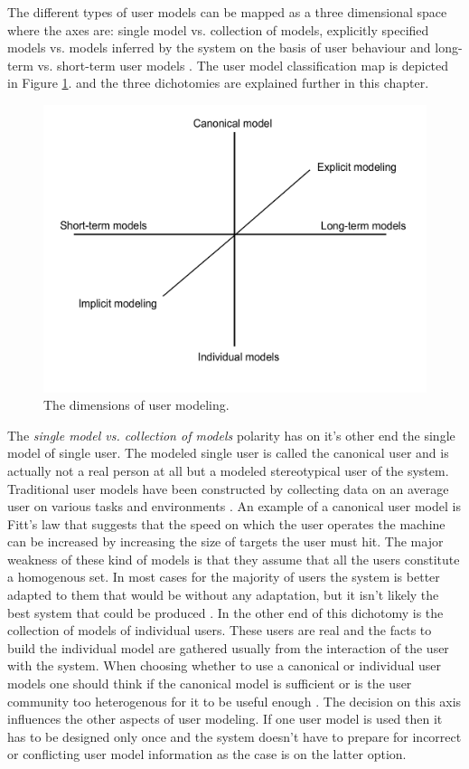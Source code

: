 \documentclass{sigchi}
\begin{document}
The different types of user models can be mapped as a three dimensional space where the axes are: single model vs. collection of models, explicitly specified models vs. models inferred by the system on the basis of user behaviour and long-term vs. short-term user models \cite{rich99}. The user model classification map is depicted in Figure \ref{dim_UM}. and the three dichotomies are explained further in this chapter. 

\begin{figure}[htp] %
\caption{The dimensions of user modeling.} \label{dim_UM}
\includegraphics[scale=0.4]{figures/dimensions_UM.pdf} 
\end{figure}

The \textit{single model vs. collection of models} polarity \cite{rich99} has on it's other end the single model of single user. The modeled single user is called the canonical user and is actually not a real person at all but a modeled stereotypical user of the system. Traditional user models have been constructed by collecting data on an average user on various tasks and environments \cite{rich99}. An example of a canonical user model is Fitt's law that suggests that the speed on which the user operates the machine can be increased by increasing the size of targets the user must hit. The major weakness of these kind of models is that they assume that all the users constitute a homogenous set. In most cases for the majority of users the system is better adapted to them that would be without any adaptation, but it isn't likely the best system that could be produced \cite{rich99}. In the other end of this dichotomy is the collection of models of individual users. These users are real and the facts to build the individual model are gathered usually from the interaction of the user with the system. When choosing whether to use a canonical or individual user models one should think if the canonical model is sufficient or is the user community too heterogenous for it to be useful enough \cite{rich99}. The decision on this axis influences the other aspects of user modeling. If one user model is used then it has to be designed only once and the system doesn't have to prepare for incorrect or conflicting user model information as the case is on the latter option. 
\end{document}
